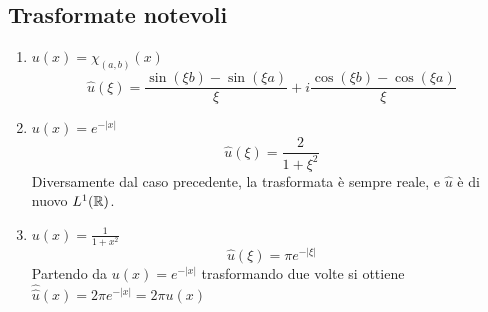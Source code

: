 \subsection{Trasformate notevoli}
\begin{enumerate}
	\item $u(x)=\chi_{(a,b)}(x)$ 
		\[\hat{u}(\xi)= \frac{\sin(\xi b)-\sin(\xi a)}{\xi}+i \frac{\cos(\xi b)-\cos(\xi a)}{\xi}\]
	\item $u(x)=e^{-|x|}$ 
		\[\hat{u}(\xi)= \frac{2}{1+\xi^2}\]
		Diversamente dal caso precedente, la trasformata è sempre reale, e $\hat{u}$ è di nuovo $L^{1}(\mathbb{R})$.
	\item $u(x)=\frac{1}{1+x^2}$ 
		\[\hat{u}(\xi)= \pi e^{-|\xi|}\]
		Partendo da $u(x)=e^{-|x|}$ trasformando due volte si ottiene $\hat{\hat{u}}(x)=2\pi e^{-|x|}=2\pi u(x)$
\end{enumerate}
